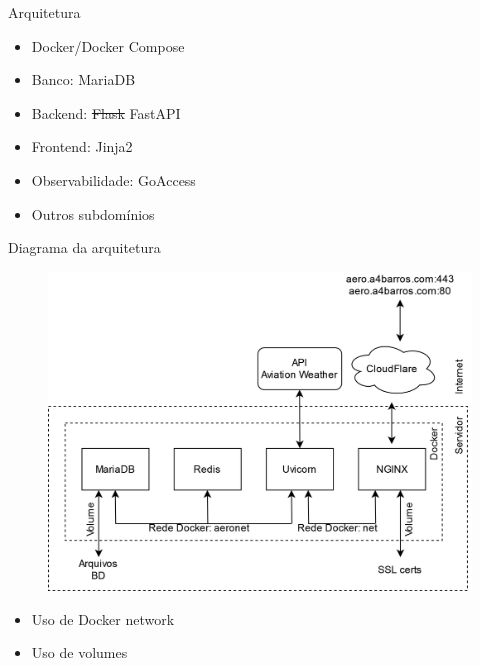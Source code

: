 \documentclass{beamer}
\begin{document}
\begin{frame}{Arquitetura}
    \begin{itemize}
        \item Docker/Docker Compose
        \item Banco: MariaDB
        \item Backend: \st{Flask} FastAPI
        \item Frontend: Jinja2
        \item Observabilidade: GoAccess
        \item Outros subdomínios
    \end{itemize}
\end{frame}

\begin{frame}{Diagrama da arquitetura}
    \begin{figure}[ht]
        \begin{center}
        \includegraphics[width=0.6\linewidth]{img/arquitetura.png}
        \label{fig:arquitetura}
        \end{center}
    \end{figure}
    \pause
    \begin{itemize}
        \item Uso de Docker network
        \item Uso de volumes
    \end{itemize}
\end{frame}
\end{document}
